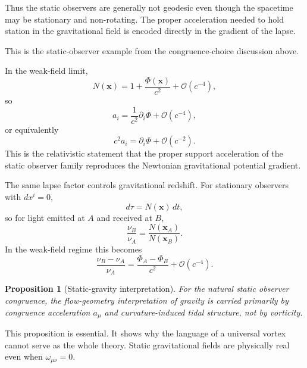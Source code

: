 \documentclass[11pt]{article}
\newtheorem{proposition}{Proposition}
\begin{document}
Thus the static observers are generally not geodesic even though the spacetime may be stationary and non-rotating. The proper acceleration needed to hold station in the gravitational field is encoded directly in the gradient of the lapse.

This is the static-observer example from the congruence-choice discussion above.

In the weak-field limit,
\begin{equation}
N(\mathbf{x})
=
1+\frac{\Phi(\mathbf{x})}{c^2}
+\mathcal{O}(c^{-4}),
\label{eq:lapseweakfield}
\end{equation}
so
\begin{equation}
a_i
=
\frac{1}{c^2}\partial_i \Phi
+\mathcal{O}(c^{-4}),
\label{eq:weakfieldacceleration}
\end{equation}
or equivalently
\begin{equation}
c^2 a_i
=
\partial_i \Phi
+\mathcal{O}(c^{-2}).
\label{eq:physicalacceleration}
\end{equation}
This is the relativistic statement that the proper support acceleration of the static observer family reproduces the Newtonian gravitational potential gradient.

The same lapse factor controls gravitational redshift. For stationary observers with \(dx^i=0\),
\begin{equation}
d\tau = N(\mathbf{x})\,dt,
\label{eq:stationarytime}
\end{equation}
so for light emitted at \(A\) and received at \(B\),
\begin{equation}
\frac{\nu_B}{\nu_A}
=
\frac{N(\mathbf{x}_A)}{N(\mathbf{x}_B)}.
\label{eq:redshift}
\end{equation}
In the weak-field regime this becomes
\begin{equation}
\frac{\nu_B-\nu_A}{\nu_A}
=
\frac{\Phi_A-\Phi_B}{c^2}
+\mathcal{O}(c^{-4}).
\label{eq:redshiftweakfield}
\end{equation}

\begin{proposition}[Static-gravity interpretation]
For the natural static observer congruence, the flow-geometry interpretation of gravity is carried primarily by congruence acceleration \(a_\mu\) and curvature-induced tidal structure, not by vorticity.
\end{proposition}

This proposition is essential. It shows why the language of a universal vortex cannot serve as the whole theory. Static gravitational fields are physically real even when \(\omega_{\mu\nu}=0\).
\end{document}
